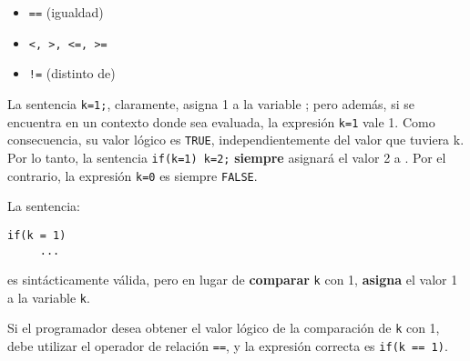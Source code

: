 \begin{itemize}
\item \lstinline{==} (igualdad)
\item \lstinline{<, >, <=, >=}
\item \lstinline{!=} (distinto de)
\end{itemize}


La sentencia \lstinline{k=1;}, claramente, asigna 1 a la variable ; pero además, si se encuentra en un contexto donde sea evaluada, la expresión \lstinline{k=1} vale 1. Como consecuencia, su valor lógico es \lstinline{TRUE}, independientemente del valor que tuviera k. Por lo tanto, la sentencia \lstinline{if(k=1) k=2;} \textbf{siempre} asignará el valor 2 a .
Por el contrario, la expresión \lstinline{k=0} es siempre \lstinline{FALSE}.

La sentencia:
\begin{lstlisting}
if(k = 1)
     ...
\end{lstlisting}     
es sintácticamente válida, pero en lugar de \textbf{comparar} \lstinline{k} con 1, \textbf{asigna} el valor 1 a la variable \lstinline{k}. 

Si el programador desea obtener el valor lógico de la comparación de \lstinline{k} con 1, debe utilizar el operador de relación \lstinline{==}, y la expresión correcta es \lstinline{if(k == 1)}. 




